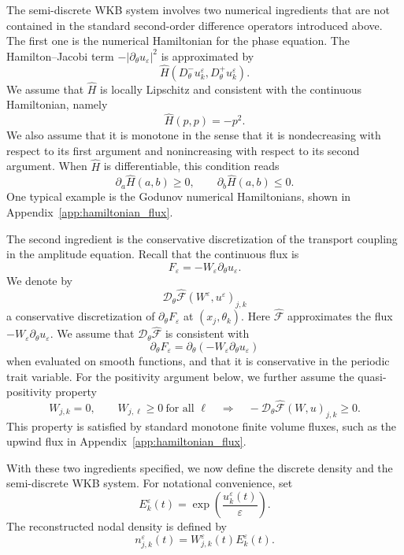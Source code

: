 \documentclass[11pt]{article}
\begin{document}
The semi-discrete WKB system involves two numerical ingredients that are not
contained in the standard second-order difference operators introduced above.
The first one is the numerical Hamiltonian for the phase equation. The
Hamilton--Jacobi term \(-|\partial_\theta u_\varepsilon|^2\) is approximated by
\[
\widehat H(D_\theta^-u_k^\varepsilon,D_\theta^+u_k^\varepsilon).
\]
We assume that \(\widehat H\) is locally Lipschitz and consistent with the
continuous Hamiltonian, namely
\[
\widehat H(p,p)=-p^2 .
\]
We also assume that it is monotone in the sense that it is nondecreasing with
respect to its first argument and nonincreasing with respect to its second
argument. When \(\widehat H\) is differentiable, this condition reads
\[
\partial_a\widehat H(a,b)\ge0,
\qquad
\partial_b\widehat H(a,b)\le0 .
\]
One typical example is the Godunov numerical Hamiltonians,
shown in Appendix~\ref{app:hamiltonian_flux}.

The second ingredient is the conservative discretization of the transport
coupling in the amplitude equation. Recall that the continuous flux is
\[
F_\varepsilon=-W_\varepsilon\partial_\theta u_\varepsilon .
\]
We denote by
\[
\mathcal D_\theta\widehat{\mathcal F}(W^\varepsilon,u^\varepsilon)_{j,k}
\]
a conservative discretization of \(\partial_\theta F_\varepsilon\) at
\((x_j,\theta_k)\). Here \(\widehat{\mathcal F}\) approximates the flux
\(-W_\varepsilon\partial_\theta u_\varepsilon\). We assume that
\(\mathcal D_\theta\widehat{\mathcal F}\) is consistent with
\[
\partial_\theta F_\varepsilon
=
\partial_\theta(-W_\varepsilon\partial_\theta u_\varepsilon)
\]
when evaluated on smooth functions, and that it is conservative in the
periodic trait variable. For the positivity argument below, we further assume
the quasi-positivity property
\begin{equation}\label{ass:H_flux}
W_{j,k}=0,
\qquad
W_{j,\ell}\ge0\ \text{for all }\ell
\quad\Longrightarrow\quad
-\mathcal D_\theta\widehat{\mathcal F}(W,u)_{j,k}\ge0 .
\end{equation}
This property is satisfied by standard monotone finite volume fluxes, such as
the upwind flux in Appendix~\ref{app:hamiltonian_flux}.

With these two ingredients specified, we now define the discrete density and
the semi-discrete WKB system. For notational convenience, set
\begin{equation}\label{def:E}
E_k^\varepsilon(t)
=
\exp\!\left(\frac{u_k^\varepsilon(t)}{\varepsilon}\right).
\end{equation}
The reconstructed nodal density is defined by
\begin{equation}\label{def:n_reconstructed}
n_{j,k}^\varepsilon(t)
=
W_{j,k}^\varepsilon(t)E_k^\varepsilon(t).
\end{equation}
\end{document}
